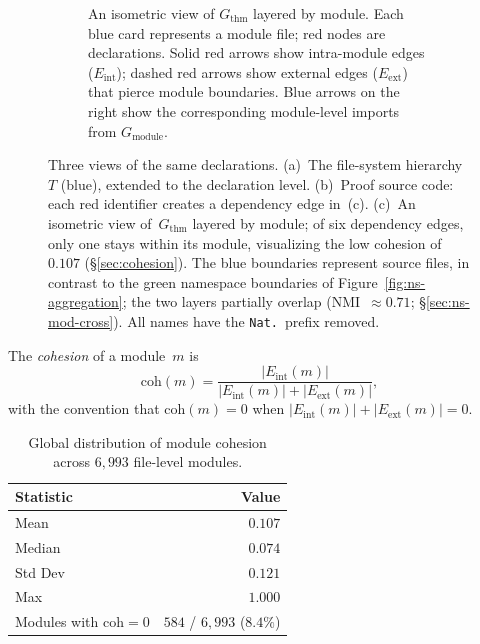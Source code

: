\begin{figure}[H]
\begin{subfigure}[b]{\textwidth}
\begin{tikzpicture}
\end{tikzpicture}
\caption{An isometric view of $G_{\mathrm{thm}}$ layered by module. Each \textcolor{blue!60!black}{blue card} represents a module file; \textcolor{red!70!black}{red nodes} are declarations. Solid \textcolor{red!70!black}{red arrows} show intra-module edges ($E_{\mathrm{int}}$); dashed \textcolor{red!70!black}{red arrows} show external edges ($E_{\mathrm{ext}}$) that pierce module boundaries. \textcolor{blue!60!black}{Blue arrows} on the right show the corresponding module-level imports from $G_{\mathrm{module}}$.}
\label{fig:dep-view}
\end{subfigure}
\caption{Three views of the same declarations. (a)~The file-system hierarchy~$T$ (\textcolor{blue!60!black}{blue}), extended to the declaration level. (b)~Proof source code: each \textcolor{red!70!black}{red identifier} creates a dependency edge in~(c). (c)~An isometric view of~$G_{\mathrm{thm}}$ layered by module; of six dependency edges, only one stays within its module, visualizing the low cohesion of~$0.107$ (\S\ref{sec:cohesion}). The \textcolor{blue!60!black}{blue} boundaries represent source files, in contrast to the \textcolor{green!40!black}{green} namespace boundaries of Figure~\ref{fig:ns-aggregation}; the two layers partially overlap (NMI~$\approx 0.71$; \S\ref{sec:ns-mod-cross}). All names have the \texttt{Nat.}\ prefix removed.}
\label{fig:module-region}
\end{figure}

\begin{definition}
The \emph{cohesion} of a module~$m$ is
\[
  \mathrm{coh}(m) = \frac{|E_{\mathrm{int}}(m)|}{|E_{\mathrm{int}}(m)| + |E_{\mathrm{ext}}(m)|},
\]
with the convention that $\mathrm{coh}(m) = 0$ when $|E_{\mathrm{int}}(m)| + |E_{\mathrm{ext}}(m)| = 0$.
\end{definition}

\begin{table}[ht]
\centering
\caption{Global distribution of module cohesion across $6{,}993$ file-level modules.}
\label{tab:cohesion-global}
\begin{tabular}{lr}
\toprule
Statistic & Value \\
\midrule
Mean       & $0.107$ \\
Median     & $0.074$ \\
Std Dev    & $0.121$ \\
Max        & $1.000$ \\
Modules with $\mathrm{coh} = 0$ & $584$ / $6{,}993$ ($8.4\%$) \\
\bottomrule
\end{tabular}
\end{table}

